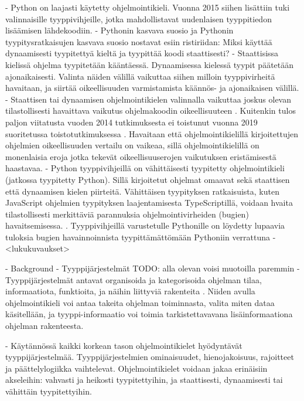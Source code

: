 \begin{otherlanguage}{finnish}
    - Python on laajasti käytetty ohjelmointikieli. Vuonna 2015 siihen lisättiin tuki valinnaisille tyyppivihjeille, jotka mahdollistavat uudenlaisen tyyppitiedon lisäämisen lähdekoodiin.
    - Pythonin kasvava suosio ja Pythonin tyypitysratkaisujen kasvava suosio nostavat esiin ristiriidan: Miksi käyttää dynaamisesti tyypitettyä kieltä ja tyypittää koodi staattisesti?
    - Staattisissa kielissä ohjelma tyypitetään kääntäessä. Dynaamisessa kielessä tyypit päätetään ajonaikaisesti. Valinta näiden välillä vaikuttaa siihen milloin tyyppivirheitä havaitaan, ja siirtää oikeellisuuden varmistamista käännös- ja ajonaikaisen välillä.
    - Staattisen tai dynaamisen ohjelmointikielen valinnalla vaikuttaa joskus olevan tilastollisesti havaittava vaikutus ohjelmakoodin oikeellisuuteen \cite{nanz_comparative_2015, ray_codequality_2014}. Kuitenkin tulos paljon viitatusta vuoden 2014 tutkimuksesta \cite{ray_codequality_2014} ei toistunut vuonna 2019 suoritetussa toistotutkimuksessa \cite{codequality_reproudction_2019}. Havaitaan että ohjelmointikielillä kirjoitettujen ohjelmien oikeellisuuden vertailu on vaikeaa, sillä ohjelmointikielillä on monenlaisia eroja jotka tekevät oikeellisuuserojen vaikutuksen eristämisestä haastavaa.
    - Python tyyppivihjeillä on vähittäisesti tyypitetty ohjelmointikieli (jatkossa tyypitetty Python). Sillä kirjoitetut ohjelmat omaavat sekä staattisen että dynaamisen kielen piirteitä. Vähittäisen tyypityksen ratkaisuista, kuten JavaScript ohjelmien tyypityksen laajentamisesta TypeScriptillä, voidaan hvaita tilastollisesti merkittäviä parannuksia ohjelmointivirheiden (bugien) havaitsemisessa. \cite{gao_to_type_or_not_2017}. Tyyppivihjeillä varustetulle Pythonille on löydetty lupaavia tuloksia bugien havainnoinnista tyypittämättömään Pythoniin verrattuna \cite{khan_empirical_2022, rak-amnouykit_taleoftwo_2020}
    - <lukukuvaukset>

- Background
    - Tyyppijärjestelmät
            TODO: alla olevan voisi muotoilla paremmin
        - Tyyppijärjestelmät antavat organisoida ja kategorisoida ohjelman tilaa, informaatiota, funktioita, ja näihin liittyviä rakenteita \cite{programming_langs}. Niiden avulla ohjelmointikieli voi antaa takeita ohjelman toiminnasta, valita miten dataa käsitellään, ja tyyppi-informaatio voi toimia tarkistettavavana lisäinformaationa ohjelman rakenteesta.

        - Käytännössä kaikki korkean tason ohjelmointikielet hyödyntävät tyyppijärjestelmää. Tyyppijärjestelmien ominaisuudet, hienojakoisuus, rajoitteet ja päättelylogiikka vaihtelevat. Ohjelmointikielet voidaan jakaa erinäisiin akseleihin: vahvasti ja heikosti tyypitettyihin, ja staattisesti, dynaamisesti tai vähittäin tyypitettyihin.


\end{otherlanguage}
